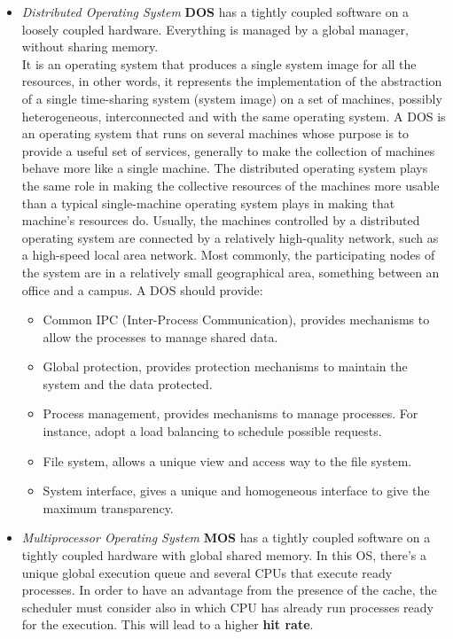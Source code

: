 \documentclass[11pt,a4paper]{article}
\begin{document}
\begin{itemize}
    \item \textit{Distributed Operating System} \textbf{DOS} has a tightly coupled software on a loosely coupled hardware. Everything is managed by a global manager, without sharing memory.\\
    It is an operating system that produces a single system image for all the resources, in other words, it represents the implementation of the abstraction of a single time-sharing system (system image) on a set of machines, possibly heterogeneous, interconnected and with the same operating system. 
    A DOS is an operating system that runs on several machines whose purpose is to provide a useful set of services, generally to make the collection of machines behave more like a single machine. The distributed operating system plays the same role in making the collective resources of the machines more usable than a typical single-machine operating system plays in making that machine's resources do. Usually, the machines controlled by a distributed operating system are connected by a relatively high-quality network, such as a high-speed local area network. Most commonly, the participating nodes of the system are in a relatively small geographical area, something between an office and a campus.
    A DOS should provide:
    \begin{itemize}
        \item Common IPC (Inter-Process Communication), provides mechanisms to allow the processes to manage shared data. 
        \item Global protection, provides protection mechanisms to maintain the system and the data protected.
        \item Process management, provides mechanisms to manage processes. For instance, adopt a load balancing to schedule possible requests.
        \item File system, allows a unique view and access way to the file system.
        \item System interface, gives a unique and homogeneous interface to give the maximum transparency.  
    \end{itemize}
    \item \textit{Multiprocessor Operating System} \textbf{MOS} has a tightly coupled software on a tightly coupled hardware with global shared memory. In this OS, there’s a unique global execution queue and several CPUs that execute ready processes. In order to have an advantage from the presence of the cache, the scheduler must consider also in which CPU has already run processes ready for the execution. This will lead to a higher \textbf{hit rate}.
\end{itemize}
\end{document}
